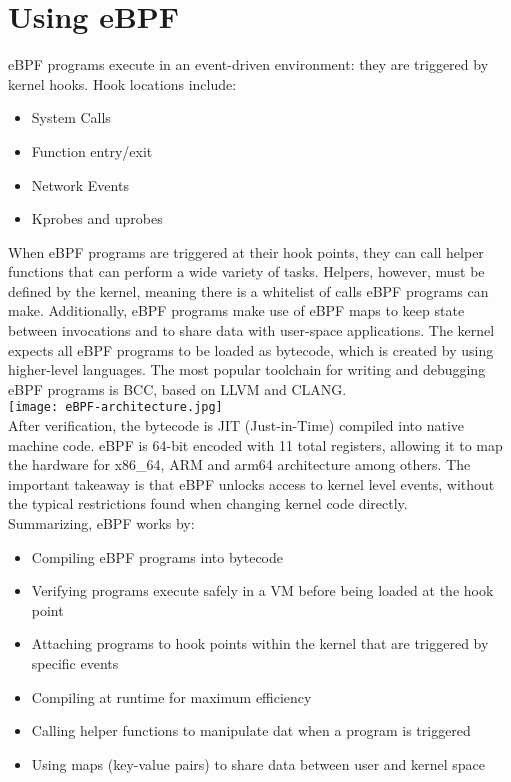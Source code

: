 \documentclass[12pt]{report}
\begin{document}
\section*{Using eBPF}
eBPF programs execute in an event-driven environment: they are triggered by kernel hooks. Hook locations include:
	\begin{itemize}
		\item System Calls
		\item Function entry/exit
		\item Network Events
		\item Kprobes and uprobes
	\end{itemize}
When eBPF programs are triggered at their hook points, they can call helper functions that can perform a wide variety of tasks. Helpers, however, must be defined by the kernel, meaning there is a whitelist of calls eBPF programs can make. Additionally, eBPF programs make use of eBPF maps to keep state between invocations and to share data with user-space applications. The kernel expects all eBPF programs to be loaded as bytecode, which is created by using higher-level languages. The most popular toolchain for writing and debugging eBPF programs is BCC, based on LLVM and CLANG.	
\\[2\baselineskip]
\texttt{[image: eBPF-architecture.jpg]}
\\[2\baselineskip]
After verification, the bytecode is JIT (Just-in-Time) compiled into native machine code. eBPF is 64-bit encoded with 11 total registers, allowing it to map the hardware for x86\_64, ARM and arm64 architecture among others. The important takeaway is that eBPF unlocks access to kernel level events, without the typical restrictions found when changing kernel code directly.
\\[2\baselineskip]
Summarizing, eBPF works by:
	\begin{itemize}
		\item Compiling eBPF programs into bytecode
		\item Verifying programs execute safely in a VM before being loaded at the hook point
		\item Attaching programs to hook points within the kernel that are triggered by specific events
		\item Compiling at runtime for maximum efficiency
		\item Calling helper functions to manipulate dat when a program is triggered
		\item Using maps (key-value pairs) to share data between user and kernel space
	\end{itemize}
\clearpage
\end{document}
